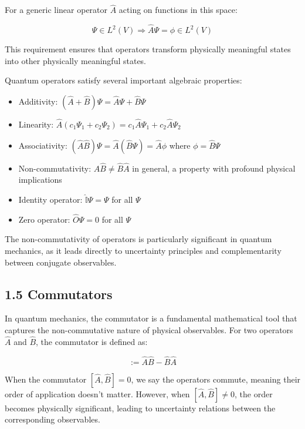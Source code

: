 \documentclass[italian]{HKNdocument}
\begin{document}
For a generic linear operator $\hat{A}$ acting on functions in this space:

\begin{equation*}
\Psi \in L^{2}(V) \Rightarrow \hat{A}\Psi = \phi \in L^{2}(V) \tag{1.51}
\end{equation*}

This requirement ensures that operators transform physically meaningful states into other physically meaningful states.

Quantum operators satisfy several important algebraic properties:

\begin{itemize}
  \item Additivity: $(\hat{A}+\hat{B})\Psi = \hat{A}\Psi + \hat{B}\Psi$
  \item Linearity: $\hat{A}(c_{1}\Psi_{1} + c_{2}\Psi_{2}) = c_{1}\hat{A}\Psi_{1} + c_{2}\hat{A}\Psi_{2}$
  \item Associativity: $(\hat{A}\hat{B})\Psi = \hat{A}(\hat{B}\Psi) = \hat{A}\phi$ where $\phi = \hat{B}\Psi$
  \item Non-commutativity: $\hat{A}\hat{B} \neq \hat{B}\hat{A}$ in general, a property with profound physical implications
  \item Identity operator: $\hat{\mathbb{I}}\Psi = \Psi$ for all $\Psi$
  \item Zero operator: $\hat{O}\Psi = 0$ for all $\Psi$
\end{itemize}

The non-commutativity of operators is particularly significant in quantum mechanics, as it leads directly to uncertainty principles and complementarity between conjugate observables.


\subsection*{1.5 Commutators}

In quantum mechanics, the commutator is a fundamental mathematical tool that captures the non-commutative nature of physical observables. For two operators $\hat{A}$ and $\hat{B}$, the commutator is defined as:

\begin{equation*}
[\hat{A}, \hat{B}] := \hat{A}\hat{B} - \hat{B}\hat{A} \tag{1.52}
\end{equation*}

When the commutator $[\hat{A}, \hat{B}] = 0$, we say the operators commute, meaning their order of application doesn't matter. However, when $[\hat{A}, \hat{B}] \neq 0$, the order becomes physically significant, leading to uncertainty relations between the corresponding observables.
\end{document}
